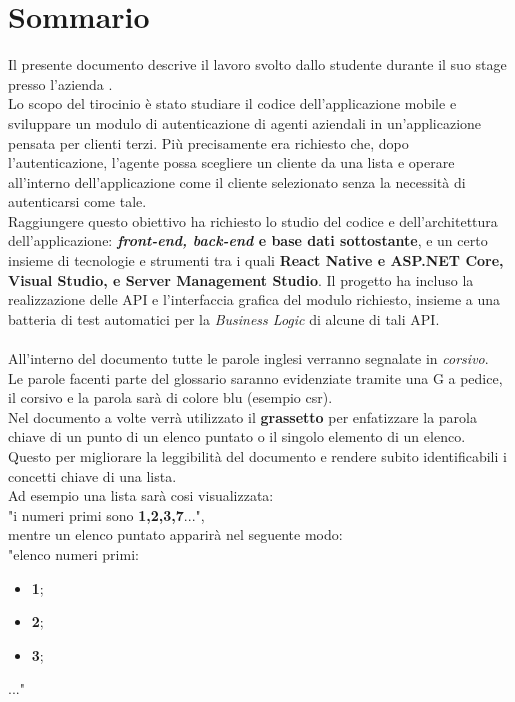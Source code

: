 \cleardoublepage
{}
{}
\begingroup
\let\clearpage\relax
\let\cleardoublepage\relax
\chapter*{Sommario}

Il presente documento descrive il lavoro svolto dallo studente {\myName} durante il suo stage presso l’azienda {\companyLong}.\\
Lo scopo del tirocinio è stato studiare il codice dell’applicazione mobile {\movi} e sviluppare un modulo di autenticazione di agenti aziendali 
in un'applicazione pensata per clienti terzi. Più precisamente era richiesto che, dopo l’autenticazione, l’agente possa scegliere un cliente da una 
lista e operare all’interno dell’applicazione come il cliente selezionato senza la necessità di autenticarsi come tale.\\
Raggiungere questo obiettivo ha richiesto lo studio del codice e dell’architettura dell’applicazione: \textbf{\textit{front-end, back-end} e base dati 
sottostante}, e un certo insieme di tecnologie e strumenti tra i quali \textbf{React Native e ASP.NET Core, Visual Studio, e Server Management Studio}. 
Il progetto ha incluso la realizzazione delle API e l’interfaccia grafica del modulo richiesto, insieme a una batteria di test automatici per la 
\textit{Business Logic} di alcune di tali API.\\\\

All'interno del documento tutte le parole inglesi verranno segnalate in \textit{corsivo}.\\
Le parole facenti parte del glossario saranno evidenziate tramite una G a pedice, il corsivo e la parola sarà di colore blu (esempio \gls{csr}).\\
Nel documento a volte verrà utilizzato il \textbf{grassetto} per enfatizzare la parola chiave di un punto di un elenco puntato o il singolo elemento di un elenco. 
Questo per migliorare la leggibilità del documento e rendere subito identificabili i concetti chiave di una lista.\\
Ad esempio una lista sarà cosi visualizzata:\\
"i numeri primi sono \textbf{1,2,3,7}...", \\
mentre un elenco puntato apparirà nel seguente modo:\\
"elenco numeri primi:
\begin{itemize}
    \item \textbf{1};\item \textbf{2};\item \textbf{3};
\end{itemize}
..."\\\\



